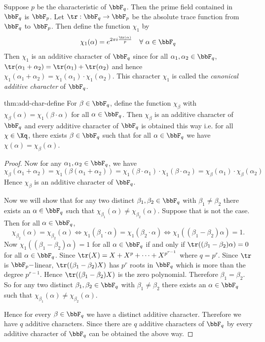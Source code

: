 Suppose $p$ be the characteristic of $\bbF_q$.  Then the prime field contained in $\bbF_q$ is $\bbF_p$. Let $\tr:\bbF_q\to\bbF_p$ be the absolute trace function from $\bbF_q$ to $\bbF_p$. Then define the function $\chi_1$ by $$\chi_1(\alpha)=e^{2\pi i\frac{\tr(\alpha)}{p}}\quad \forall\ \alpha\in \bbF_q$$Then $\chi_1$ is an additive character of $\bbF_q$ since for all $\alpha_1,\alpha_2\in\bbF_q$, $\tr(\alpha_1+\alpha_2)=\tr(\alpha_1)+\tr(\alpha_2)$ and hence $\chi_1(\alpha_1+\alpha_2)=\chi_1(\alpha_1)\cdot \chi_1(\alpha_2)$. This character $\chi_1$ is called the \emph{canonical additive character} of $\bbF_q$.
\begin{Theorem}{}{thm:add-char-define}
  For $\beta\in\bbF_q$, define the function $\chi_{\beta}$ with $\chi_{\beta}(\alpha)=\chi_1(\beta\cdot \alpha)$ for all $\alpha\in\bbF_q$. Then $\chi_{\beta}$ is an additive character of $\bbF_q$ and every additive character of $\bbF_q$ is obtained this way i.e. for all $\chi\in\Xq$, there exists $\beta\in\bbF_q$ such that for all $\alpha\in\bbF_q$ we have $\chi(\alpha)=\chi_{\beta}(\alpha)$. 
\end{Theorem}
\begin{proof}
  Now for any $\alpha_1,\alpha_2\in\bbF_q$, we have $$\chi_{\beta}(\alpha_1+\alpha_2)=\chi_1(\beta(\alpha_1+\alpha_2))=\chi_1(\beta\cdot \alpha_1)\cdot \chi_1(\beta\cdot \alpha_2)=\chi_{\beta}(\alpha_1)\cdot \chi_{\beta}(\alpha_2)$$ Hence $\chi_{\beta}$ is an additive character of $\bbF_q$.

  Now we will show that for any two distinct $\beta_1,\beta_2\in\bbF_q$ with $\beta_1\neq \beta_2$ there exists an $\alpha\in\bbF_q$ such that $\chi_{\beta_1}(\alpha)\neq \chi_{\beta_2}(\alpha)$. Suppose that is not the case. Then for all $\alpha\in\bbF_q$, $$\chi_{\beta_2}(\alpha)=\chi_{\beta_2}(\alpha)\iff \chi_1(\beta_1\cdot \alpha)=\chi_1(\beta_2\cdot \alpha)\iff \chi_1((\beta_1-\beta_2)\alpha)=1.$$Now $\chi_1((\beta_1-\beta_2)\alpha)=1$ for all $\alpha\in \bbF_q$ if and only if $\tr((\beta_1-\beta_2)\alpha)=0$ for all $\alpha\in\bbF_q$. Since  $\tr(X)=X+X^{p}+\cdots+X^{p^{r-1}}$ where $q=p^r$. Since $\tr$ is $\bbF_p-$linear,  $\tr((\beta_1-\beta_2)X)$ has $p^r$ roots in $\bbF_q$ which is more than the degree $p^{r-1}$. Hence $\tr((\beta_1-\beta_2)X)$ is the zero polynomial. Therefore $\beta_1=\beta_2$. So for any two distinct $\beta_1,\beta_2\in\bbF_q$ with $\beta_1\neq \beta_2$ there exists an $\alpha\in\bbF_q$ such that $\chi_{\beta_1}(\alpha)\neq \chi_{\beta_2}(\alpha)$.

  Hence for every $\beta\in\bbF_q$ we have a distinct additive character. Therefore we have $q$ additive characters. Since there are $q$ additive characters of $\bbF_q$ by  every additive character of $\bbF_q$ can be obtained the above way.
\end{proof}
 

